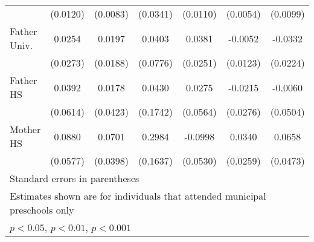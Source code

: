 \begin{table}[htbp]
\begin{tabular}{l*{6}{c}}
            &    (0.0120)         &    (0.0083)         &    (0.0341)         &    (0.0110)         &    (0.0054)         &    (0.0099)         \\
\addlinespace
Father Univ.&      0.0254         &      0.0197         &      0.0403         &      0.0381         &     -0.0052         &     -0.0332         \\
            &    (0.0273)         &    (0.0188)         &    (0.0776)         &    (0.0251)         &    (0.0123)         &    (0.0224)         \\
\addlinespace
Father HS   &      0.0392         &      0.0178         &      0.0430         &      0.0275         &     -0.0215         &     -0.0060         \\
            &    (0.0614)         &    (0.0423)         &    (0.1742)         &    (0.0564)         &    (0.0276)         &    (0.0504)         \\
\addlinespace
Mother HS   &      0.0880         &      0.0701         &      0.2984         &     -0.0998         &      0.0340         &      0.0658         \\
            &    (0.0577)         &    (0.0398)         &    (0.1637)         &    (0.0530)         &    (0.0259)         &    (0.0473)         \\
\bottomrule
\multicolumn{7}{l}{\footnotesize Standard errors in parentheses}\\
\multicolumn{7}{l}{\footnotesize Estimates shown are for individuals that attended municipal preschools only}\\
\multicolumn{7}{l}{\footnotesize \sym{*} \(p<0.05\), \sym{**} \(p<0.01\), \sym{***} \(p<0.001\)}\\
\end{tabular}
\end{table}
